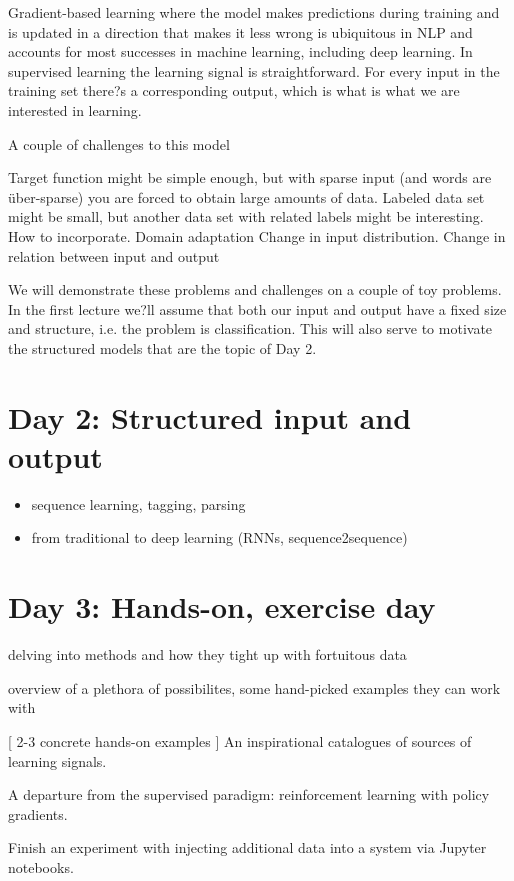 \documentclass{article}
\begin{document}
Gradient-based learning where the model makes predictions during training and is updated in a direction that makes it less wrong is ubiquitous in NLP and accounts for most successes in machine learning, including deep learning. In supervised learning the learning signal is straightforward. For every input in the training set there?s a corresponding output, which is what is what we are interested in learning. 

A couple of challenges to this model

Target function might be simple enough, but with sparse input (and words are \"uber-sparse) you are forced to obtain large amounts of data.
Labeled data set might be small, but another data set with related labels might be interesting. How to incorporate.  
Domain adaptation
Change in input distribution.
Change in relation between input and output

We will demonstrate these problems and challenges on a couple of toy problems. In the first lecture we?ll assume that both our input and output have a fixed size and structure, i.e. the problem is classification. This will also serve to motivate the structured models that are the topic of Day 2. 


\section{Day 2: Structured input and output}

\begin{itemize}
\item sequence learning, tagging, parsing
\item from traditional to deep learning (RNNs, sequence2sequence)
\end{itemize}

\section{Day 3: Hands-on, exercise day}
delving into methods and how
they tight up with fortuitous data 

overview of a plethora of possibilites, some
hand-picked examples they can work with


[ 2-3 concrete hands-on examples ] 
An inspirational catalogues of sources of learning signals.

A departure from the supervised paradigm: reinforcement learning with policy gradients.

Finish an experiment with injecting additional data into a system via Jupyter notebooks.
\end{document}

